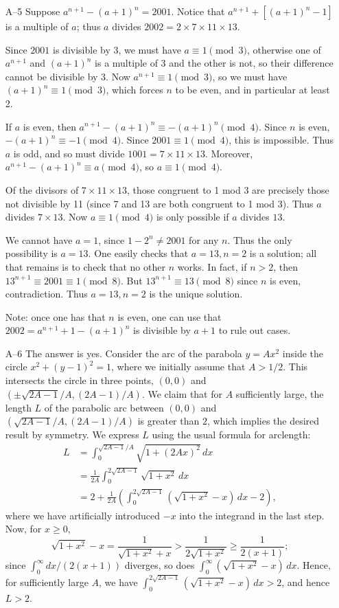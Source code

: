\documentclass[amssymb,twocolumn,pra,10pt,aps]{revtex4-1}
\begin{document}
\begin{itemize}
\item[A--5]
Suppose $a^{n+1} - (a+1)^n = 2001$.
Notice that $a^{n+1} + [(a+1)^n - 1]$ is a multiple of $a$; thus
$a$ divides $2002 = 2 \times 7 \times 11 \times 13$.

Since $2001$ is divisible by 3, we must have $a \equiv 1 \pmod{3}$,
otherwise one of $a^{n+1}$ and $(a+1)^n$ is a multiple of 3 and the
other is not, so their difference cannot be divisible by 3. Now
$a^{n+1} \equiv 1 \pmod{3}$, so we must have $(a+1)^n \equiv 1
\pmod{3}$, which forces $n$ to be even, and in particular at least 2.

If $a$ is even, then $a^{n+1} - (a+1)^n \equiv -(a+1)^n \pmod{4}$.
Since $n$ is even, $-(a+1)^n \equiv -1 \pmod{4}$. Since $2001 \equiv 1
\pmod{4}$, this is impossible. Thus $a$ is odd, and so must divide
$1001 = 7 \times 11 \times 13$. Moreover, $a^{n+1} - (a+1)^n \equiv a
\pmod{4}$, so $a \equiv 1 \pmod{4}$.

Of the divisors of $7 \times 11 \times 13$, those congruent to 1 mod 3
are precisely those not divisible by 11 (since 7 and 13 are both
congruent to 1 mod 3). Thus $a$ divides $7 \times 13$. Now
$a \equiv 1 \pmod{4}$ is only possible if $a$ divides $13$.

We cannot have $a=1$, since $1 - 2^n \neq 2001$ for any $n$. Thus
the only possibility is $a = 13$. One easily checks that $a=13, n=2$ is a
solution; all that remains is to check that no other $n$ works. In fact,
if $n > 2$, then $13^{n+1} \equiv 2001 \equiv 1 \pmod{8}$.
But $13^{n+1} \equiv 13 \pmod{8}$ since $n$ is even, contradiction.
Thus $a=13, n=2$ is the unique solution.

Note: once one has that $n$ is even, one can use that $2002
=a^{n+1} + 1 - (a+1)^n$ is divisible by $a+1$ to rule out cases.

\item[A--6]
The answer is yes.  Consider the arc of the parabola
$y=Ax^2$ inside the circle $x^2+(y-1)^2 = 1$, where we initially assume
that $A > 1/2$.  This intersects the circle in three points,
$(0,0)$ and $(\pm \sqrt{2A-1}/A, (2A-1)/A)$.  We claim that for
$A$ sufficiently large, the length $L$ of the parabolic arc between
$(0,0)$ and $(\sqrt{2A-1}/A, (2A-1)/A)$ is greater than $2$, which
implies the desired result by symmetry.  We express $L$ using the
usual formula for arclength:
\begin{align*}
L &= \int_0^{\sqrt{2A-1}/A} \sqrt{1+(2Ax)^2} \, dx \\
&= \frac{1}{2A} \int_0^{2\sqrt{2A-1}} \sqrt{1+x^2} \, dx \\
&= 2 + \frac{1}{2A} \left( \int_0^{2\sqrt{2A-1}}
(\sqrt{1+x^2}-x)\,dx -2\right),
\end{align*}
where we have artificially introduced $-x$ into the integrand in the
last step.  Now, for $x \geq 0$,
\[
\sqrt{1+x^2}-x = \frac{1}{\sqrt{1+x^2}+x} > \frac{1}{2\sqrt{1+x^2}}
\geq \frac{1}{2(x+1)};
\]
since $\int_0^\infty dx/(2(x+1))$ diverges, so does
$\int_0^\infty (\sqrt{1+x^2}-x)\,dx$.  Hence, for sufficiently large
$A$, we have $\int_0^{2\sqrt{2A-1}} (\sqrt{1+x^2}-x)\,dx > 2$,
and hence $L > 2$.


\end{itemize}
\end{document}
